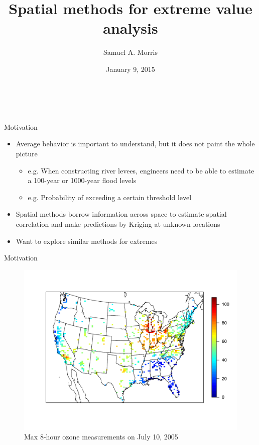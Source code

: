 \documentclass{beamer}
\title[Spatial methods for extreme value analysis] %
{
  Spatial methods for extreme value analysis
}
\author[Samuel A. Morris]{Samuel A. Morris}
\institute[NCSU]{}
\date{January 9, 2015}
\begin{document}
\begin{frame}\frametitle{\ }
\begin{center}
  \maketitle
\end{center}
\end{frame}

\begin{frame}{Motivation}
  \begin{itemize} \setlength{\itemsep}{1em}
    \item Average behavior is important to understand, but it does not paint the whole picture
    \begin{itemize}
      \item e.g. When constructing river levees, engineers need to be able to estimate a 100-year or 1000-year flood levels
      \item e.g. Probability of exceeding a certain threshold level
    \end{itemize}
    \item Spatial methods borrow information across space to estimate spatial correlation and make predictions by Kriging at unknown locations
    \item Want to explore similar methods for extremes
  \end{itemize}
\end{frame}

\begin{frame}{Motivation}
  \centering
  \begin{figure}
    \includegraphics[width=\linewidth, trim=0 1in 0 0in ]{./plots/pot/ozone-10jul-us.pdf}
    \caption{Max 8-hour ozone measurements on July 10, 2005}
   \end{figure}
\end{frame}
\end{document}
